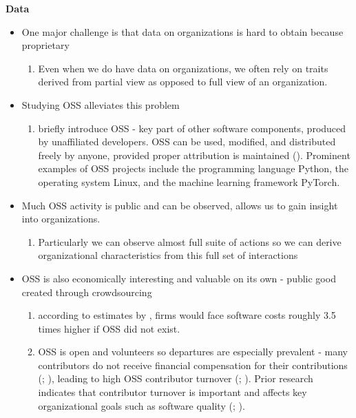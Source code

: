 \documentclass[12pt,notitlepage]{article}
\begin{document}
\textbf{Data}\\
\begin{itemize}
    \item One major challenge is that data on organizations is hard to obtain because proprietary 
    \begin{enumerate}
        \item Even when we do have data on organizations, we often rely on traits derived from partial view as opposed to full view of an organization.
    \end{enumerate}
    \item Studying OSS alleviates this problem
    \begin{enumerate}
        \item briefly introduce OSS - key part of other software components, produced by unaffiliated developers. OSS can be used, modified, and distributed freely by anyone, provided proper attribution is maintained (\cite{linux_foundation_what_2017}). Prominent examples of OSS projects include the programming language Python, the operating system Linux, and the machine learning framework PyTorch. 
    \end{enumerate}
    \item Much OSS activity is public and can be observed, allows us to gain insight into organizations. 
    \begin{enumerate}
        \item Particularly we can observe almost full suite of actions so we can derive organizational characteristics from this full set of interactions
    \end{enumerate}
    \item OSS is also economically interesting and valuable on its own - public good created through crowdsourcing
    \begin{enumerate}
        \item according to estimates by \cite{hoffmann_value_2024}, firms would face software costs roughly 3.5 times higher if OSS did not exist. 
        \item     OSS is open and volunteers so departures are especially prevalent - many contributors do not receive financial compensation for their contributions (\cite{robles_evolution_2005}; \cite{xu_volunteers_2010}), leading to high OSS contributor turnover (\cite{izquierdo-cortazar_using_2009}; \cite{rashid_systematic_2019}). Prior research indicates that contributor turnover is important and affects key organizational goals such as  software quality (\cite{mockus_organizational_2010}; \cite{foucault_impact_2015}). 
    \end{enumerate}
\end{itemize}
\end{document}
